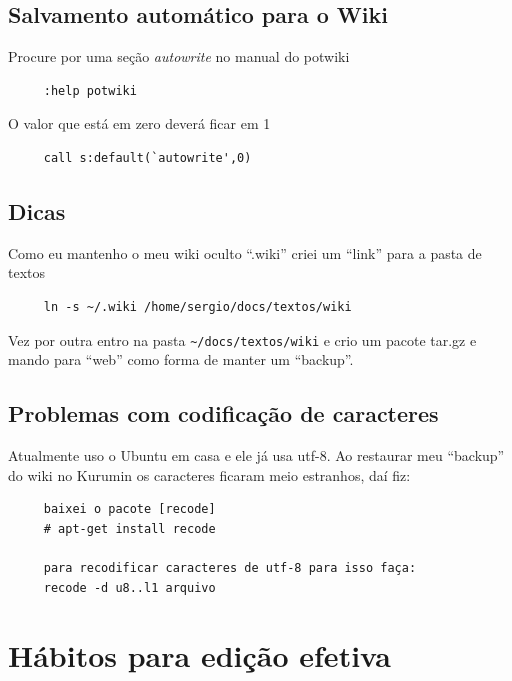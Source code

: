 \documentclass[10pt,a4paper,openany]{book}
\begin{document}
\section{Salvamento automático para o Wiki }
\label{Salvamento automático para o wiki }
Procure por uma seção {\em autowrite} no manual do potwiki

\begin{verbatim}
     :help potwiki
\end{verbatim}

O valor que está em zero deverá ficar em 1

\begin{verbatim}
     call s:default(`autowrite',0)
\end{verbatim}

\section{Dicas}
\label{Dicas}
Como eu mantenho o meu wiki oculto ``.wiki'' criei um ``link'' para a pasta de textos

\begin{verbatim}
     ln -s ~/.wiki /home/sergio/docs/textos/wiki
\end{verbatim}

Vez por outra entro na pasta \verb|~/docs/textos/wiki| e crio um
pacote tar.gz e mando para ``web'' como forma de manter um ``backup''.

\section{Problemas com codificação de caracteres}
\label{Problemas com codificação de caracteres}

Atualmente uso o Ubuntu em casa e ele já usa utf-8. Ao restaurar meu
``backup'' do wiki no Kurumin os caracteres ficaram meio estranhos,
daí fiz:

\begin{verbatim}
     baixei o pacote [recode]
     # apt-get install recode
     
     para recodificar caracteres de utf-8 para isso faça:
     recode -d u8..l1 arquivo
\end{verbatim}

\chapter{Hábitos para edição efetiva}
\label{cha:Hábitos para edição efetiva}
\end{document}
